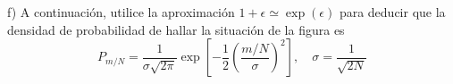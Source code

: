 f) A continuación, utilice la aproximación $1+\epsilon \simeq \exp (\epsilon)$ para deducir que la densidad de probabilidad de hallar la situación de la figura es
$$
P_{m / N}=\frac{1}{\sigma \sqrt{2 \pi}} \exp \left[-\frac{1}{2}\left(\frac{m / N}{\sigma}\right)^2\right], \quad \sigma=\frac{1}{\sqrt{2 N}}
$$
